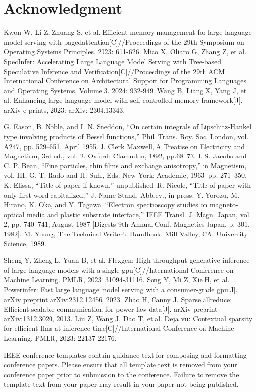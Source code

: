 \documentclass[conference]{IEEEtran}
\begin{document}
\section*{Acknowledgment}

\begin{thebibliography}{00}
     Kwon W, Li Z, Zhuang S, et al. Efficient memory management for large language model serving with pagedattention[C]//Proceedings of the 29th Symposium on Operating Systems Principles. 2023: 611-626.
     Miao X, Oliaro G, Zhang Z, et al. SpecInfer: Accelerating Large Language Model Serving with Tree-based Speculative Inference and Verification[C]//Proceedings of the 29th ACM International Conference on Architectural Support for Programming Languages and Operating Systems, Volume 3. 2024: 932-949.
     Wang B, Liang X, Yang J, et al. Enhancing large language model with self-controlled memory framework[J]. arXiv e-prints, 2023: arXiv: 2304.13343.

     G. Eason, B. Noble, and I. N. Sneddon, ``On certain integrals of Lipschitz-Hankel type involving products of Bessel functions,'' Phil. Trans. Roy. Soc. London, vol. A247, pp. 529--551, April 1955.
     J. Clerk Maxwell, A Treatise on Electricity and Magnetism, 3rd ed., vol. 2. Oxford: Clarendon, 1892, pp.68--73.
     I. S. Jacobs and C. P. Bean, ``Fine particles, thin films and exchange anisotropy,'' in Magnetism, vol. III, G. T. Rado and H. Suhl, Eds. New York: Academic, 1963, pp. 271--350.
     K. Elissa, ``Title of paper if known,'' unpublished.
     R. Nicole, ``Title of paper with only first word capitalized,'' J. Name Stand. Abbrev., in press.
     Y. Yorozu, M. Hirano, K. Oka, and Y. Tagawa, ``Electron spectroscopy studies on magneto-optical media and plastic substrate interface,'' IEEE Transl. J. Magn. Japan, vol. 2, pp. 740--741, August 1987 [Digests 9th Annual Conf. Magnetics Japan, p. 301, 1982].
     M. Young, The Technical Writer's Handbook. Mill Valley, CA: University Science, 1989.

    Sheng Y, Zheng L, Yuan B, et al. Flexgen: High-throughput generative inference of large language models with a single gpu[C]//International Conference on Machine Learning. PMLR, 2023: 31094-31116.
    Song Y, Mi Z, Xie H, et al. Powerinfer: Fast large language model serving with a consumer-grade gpu[J]. arXiv preprint arXiv:2312.12456, 2023.
    Zhao H, Canny J. Sparse allreduce: Efficient scalable communication for power-law data[J]. arXiv preprint arXiv:1312.3020, 2013.
    Liu Z, Wang J, Dao T, et al. Deja vu: Contextual sparsity for efficient llms at inference time[C]//International Conference on Machine Learning. PMLR, 2023: 22137-22176.
\end{thebibliography}
\vspace{12pt}
\color{red}
IEEE conference templates contain guidance text for composing and formatting conference papers. Please ensure that all template text is removed from your conference paper prior to submission to the conference. Failure to remove the template text from your paper may result in your paper not being published.
\end{document}
